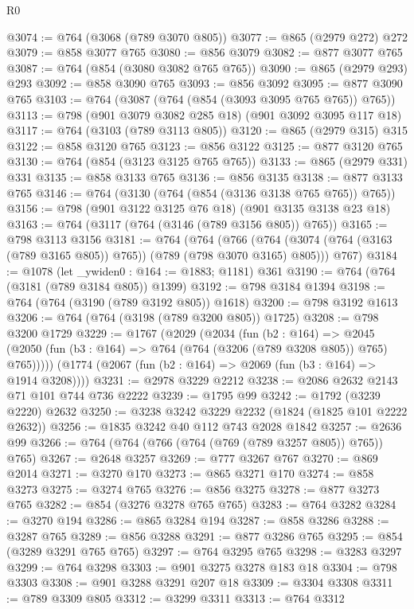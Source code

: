 \begin{lexlean}{R0}
\begin{coremodule}
{{{{{@3074 := @764 (@3068 (@789 @3070 @805))
@3077 := @865 (@2979 @272) @272
@3079 := @858 @3077 @765
@3080 := @856 @3079
@3082 := @877 @3077 @765
@3087 := @764 (@854 (@3080 @3082 @765 @765))
@3090 := @865 (@2979 @293) @293
@3092 := @858 @3090 @765
@3093 := @856 @3092
@3095 := @877 @3090 @765
@3103 := @764 (@3087 (@764 (@854 (@3093 @3095 @765 @765)) @765))
@3113 := @798 (@901 @3079 @3082 @285 @18) (@901 @3092 @3095 @117 @18)
@3117 := @764 (@3103 (@789 @3113 @805))
@3120 := @865 (@2979 @315) @315
@3122 := @858 @3120 @765
@3123 := @856 @3122
@3125 := @877 @3120 @765
@3130 := @764 (@854 (@3123 @3125 @765 @765))
@3133 := @865 (@2979 @331) @331
@3135 := @858 @3133 @765
@3136 := @856 @3135
@3138 := @877 @3133 @765
@3146 := @764 (@3130 (@764 (@854 (@3136 @3138 @765 @765)) @765))
@3156 := @798 (@901 @3122 @3125 @76 @18) (@901 @3135 @3138 @23 @18)
@3163 := @764 (@3117 (@764 (@3146 (@789 @3156 @805)) @765))
@3165 := @798 @3113 @3156
@3181 := @764
    (@764
      (@766 (@764 (@3074 (@764 (@3163 (@789 @3165 @805)) @765)) (@789 (@798 @3070 @3165) @805)))
      @767)
@3184 := @1078 (let _ywiden0 : @164 := @1883; @1181) @361
@3190 := @764 (@764 (@3181 (@789 @3184 @805)) @1399)
@3192 := @798 @3184 @1394
@3198 := @764 (@764 (@3190 (@789 @3192 @805)) @1618)
@3200 := @798 @3192 @1613
@3206 := @764 (@764 (@3198 (@789 @3200 @805)) @1725)
@3208 := @798 @3200 @1729
@3229 := @1767
    (@2029
      (@2034
        (fun (b2 : @164) =>
        @2045 (@2050 (fun (b3 : @164) => @764 (@764 (@3206 (@789 @3208 @805)) @765) @765)))))
    (@1774 (@2067 (fun (b2 : @164) => @2069 (fun (b3 : @164) => @1914 @3208))))
@3231 := @2978 @3229 @2212
@3238 := @2086 @2632 @2143 @71 @101 @744 @736 @2222
@3239 := @1795 @99
@3242 := @1792 (@3239 @2220) @2632
@3250 := @3238 @3242 @3229 @2232 (@1824 (@1825 @101 @2222 @2632))
@3256 := @1835 @3242 @40 @112 @743 @2028 @1842
@3257 := @2636 @99
@3266 := @764 (@764 (@766 (@764 (@769 (@789 @3257 @805)) @765)) @765)
@3267 := @2648 @3257
@3269 := @777 @3267 @767
@3270 := @869 @2014
@3271 := @3270 @170
@3273 := @865 @3271 @170
@3274 := @858 @3273
@3275 := @3274 @765
@3276 := @856 @3275
@3278 := @877 @3273 @765
@3282 := @854 (@3276 @3278 @765 @765)
@3283 := @764 @3282
@3284 := @3270 @194
@3286 := @865 @3284 @194
@3287 := @858 @3286
@3288 := @3287 @765
@3289 := @856 @3288
@3291 := @877 @3286 @765
@3295 := @854 (@3289 @3291 @765 @765)
@3297 := @764 @3295 @765
@3298 := @3283 @3297
@3299 := @764 @3298
@3303 := @901 @3275 @3278 @183 @18
@3304 := @798 @3303
@3308 := @901 @3288 @3291 @207 @18
@3309 := @3304 @3308
@3311 := @789 @3309 @805
@3312 := @3299 @3311
@3313 := @764 @3312
}}}}}
\end{coremodule}
\end{lexlean}
